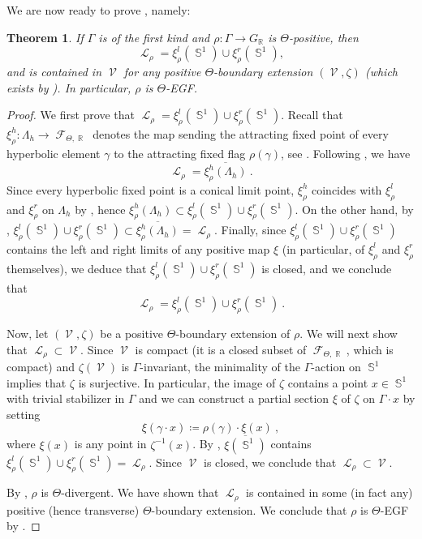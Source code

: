 \documentclass{amsart}
\theoremstyle{plain}
\newtheorem{theorem}[proposition]{Theorem}
\theoremstyle{definition}
\DeclareMathOperator{\Fc}{\mathcal{F}}
\DeclareMathOperator{\Lc}{\mathcal{L}}
\DeclareMathOperator{\Vc}{\mathcal{V}}
\DeclareMathOperator{\Rb}{{\mathbb{R}}}
\DeclareMathOperator{\Sb}{\mathbb{S}}
\newcommand*\from{\colon}
\newcommand{\1}{\mathbf{1}}
\begin{document}
We are now ready to prove , namely:
\begin{theorem}\label{theorem: extended positive representations are extended geometrically finite}
    If $\Gamma$ is of the first kind and $\rho \from \Gamma\to G_{\Rb}$ is $\Theta$-positive, then 
    \[\Lc_\rho = \xi^l_\rho(\Sb^1)\cup \xi^r_\rho(\Sb^1),\] 
    and is contained in $\Vc$ for any positive $\Theta$-boundary extension $(\Vc,\zeta)$ (which exists by ). In particular, $\rho$ is $\Theta$-EGF.
\end{theorem}
\begin{proof}
    We first prove that $\Lc_\rho = \xi^l_\rho(\Sb^1)\cup \xi^r_\rho(\Sb^1)$.
    Recall that $\xi^h_\rho\colon \Lambda_h \to \Fc_{\Theta,\Rb}$ denotes the map sending the attracting fixed point of every hyperbolic element $\gamma$ to the attracting fixed flag $\rho(\gamma)$, see .
    Following , we have 
    \[\Lc_\rho = \overline{\xi_\rho^h(\Lambda_h)}~.\]
    Since every hyperbolic fixed point is a conical limit point, $\xi_\rho^h$ coincides with $\xi_\rho^l$ and $\xi_\rho^r$ on $\Lambda_h$ by , hence $\xi_\rho^h(\Lambda_h) \subset \xi^l_\rho(\Sb^1) \cup \xi^r_\rho(\Sb^1)$.
    On the other hand, by , $\xi^l_\rho(\Sb^1) \cup \xi^r_\rho(\Sb^1) \subset \overline{\xi_\rho^h(\Lambda_h)} = \Lc_\rho$.
    Finally, since $\xi^l_\rho(\Sb^1)\cup \xi^r_\rho(\Sb^1)$ contains the left and right limits of any positive map $\xi$ (in particular, of $\xi^l_\rho$ and $\xi^r_\rho$ themselves), we deduce that $\xi^l_\rho(\Sb^1) \cup \xi^r_\rho(\Sb^1)$ is closed, and we conclude that
    \[\Lc_\rho = \xi^l_\rho(\Sb^1) \cup \xi^r_\rho(\Sb^1)~.\]

    Now, let $(\Vc,\zeta)$ be a positive $\Theta$-boundary extension of $\rho$. We will next show that $\Lc_\rho\subset\Vc$. Since $\Vc$ is compact (it is a closed subset of $\Fc_{\Theta,\Rb}$, which is compact) and $\zeta(\Vc)$ is $\Gamma$-invariant, the minimality of the $\Gamma$-action on $\Sb^1$ implies that $\zeta$ is surjective. In particular, the image of $\zeta$ contains a point $x \in \Sb^1$ with trivial stabilizer in $\Gamma$ and we can construct a partial section $\xi$ of $\zeta$ on $\Gamma\cdot x$ by setting \[\xi(\gamma\cdot x) \coloneqq  \rho(\gamma)\cdot \xi(x)~,\]
    where $\xi(x)$ is any point in $\zeta^{-1}(x)$.
    By , $\overline{\xi(\Sb^1)}$ contains $\xi^l_\rho(\Sb^1) \cup \xi^r_\rho(\Sb^1) =\Lc_\rho$. Since $\Vc$ is closed, we conclude that $\Lc_\rho \subset \Vc$. 
    
     By , $\rho$ is $\Theta$-divergent. We have shown that $\Lc_\rho$ is contained in some (in fact any) positive (hence transverse) $\Theta$-boundary extension. We conclude that $\rho$ is $\Theta$-EGF by .
\end{proof}
\end{document}
